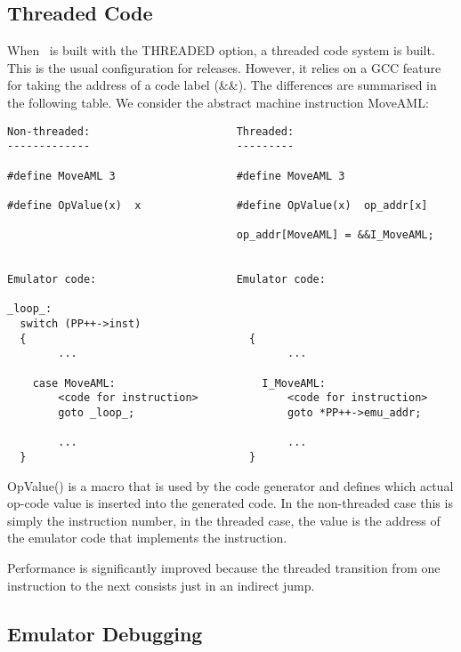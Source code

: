 \subsection{Threaded Code}

When \eclipse\ is built with the THREADED option, a threaded code
system is built. This is the usual configuration for releases.
However, it relies on a GCC feature for taking the address of
a code label (\&\&). The differences are summarised in the following
table. We consider the abstract machine instruction MoveAML:
\begin{verbatim}
Non-threaded:                       Threaded:
-------------                       ---------

#define MoveAML 3                   #define MoveAML 3            
                                                                 
#define OpValue(x)  x               #define OpValue(x)  op_addr[x]

                                    op_addr[MoveAML] = &&I_MoveAML;    
                                                                 

Emulator code:                      Emulator code:

_loop_:
  switch (PP++->inst)
  {                                   {
        ...                                 ...

    case MoveAML:                       I_MoveAML:                   
        <code for instruction>              <code for instruction>       
        goto _loop_;                        goto *PP++->emu_addr;       

        ...                                 ...
  }                                   }
\end{verbatim}
OpValue() is a macro that is used by the code generator and
defines which actual op-code value is inserted into the generated code.
In the non-threaded case this is simply the instruction number,
in the threaded case, the value is the address of the emulator
code that implements the instruction.

Performance is significantly improved because the threaded transition
from one instruction to the next consists just in an indirect jump.


\subsection{Emulator Debugging}

